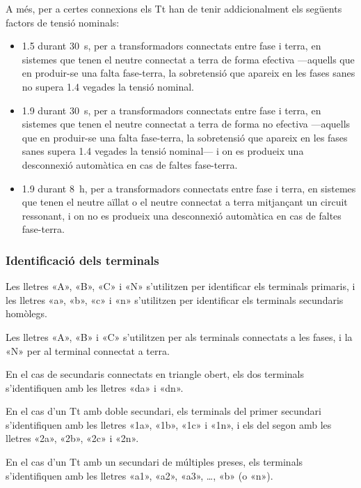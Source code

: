 A més, per a certes connexions els Tt han de tenir addicionalment els següents factors de tensió nominals:
 \begin{itemize}
   \item \num{1,5} durant \qty{30}{s},  per a transformadors connectats entre fase i terra, en sistemes que tenen el neutre connectat a terra de forma efectiva ---aquells que en produir-se una falta fase-terra, la sobretensió que apareix en les fases sanes no supera \num{1,4} vegades la tensió nominal.
   \item \num{1,9} durant \qty{30}{s},  per a transformadors connectats entre fase i terra, en sistemes que tenen el neutre connectat a terra de forma no efectiva ---aquells que en produir-se una falta fase-terra, la sobretensió que apareix en les fases sanes  supera \num{1,4} vegades la tensió nominal--- i on es produeix una desconnexió automàtica  en cas de faltes fase-terra.
   \item \num{1,9} durant \qty{8}{h},  per a transformadors connectats entre fase i terra, en sistemes que tenen el neutre aïllat o el neutre connectat a terra mitjançant un circuit ressonant, i on no es produeix una desconnexió automàtica  en cas de faltes fase-terra.
\end{itemize}

\subsubsection{Identificació dels terminals}

 Les lletres «A», «B», «C» i «N» s'utilitzen per identificar els terminals primaris, i les lletres «a», «b», «c» i «n» s'utilitzen per identificar els terminals secundaris homòlegs.

 Les lletres «A», «B» i «C» s'utilitzen per als terminals connectats a les fases, i la «N» per al terminal connectat a terra.

 En el cas de secundaris connectats en triangle obert, els dos terminals s'identifiquen amb les lletres «da» i «dn».

 En el cas d'un Tt amb doble secundari, els terminals del  primer secundari s'identifiquen amb les lletres  «1a», «1b», «1c» i «1n», i els del segon amb les lletres  «2a», «2b», «2c» i «2n».

 En el cas d'un Tt amb un  secundari de  múltiples preses, els terminals s'identifiquen amb les lletres  «a1», «a2», «a3», \ldots, «b» (o «n»).

